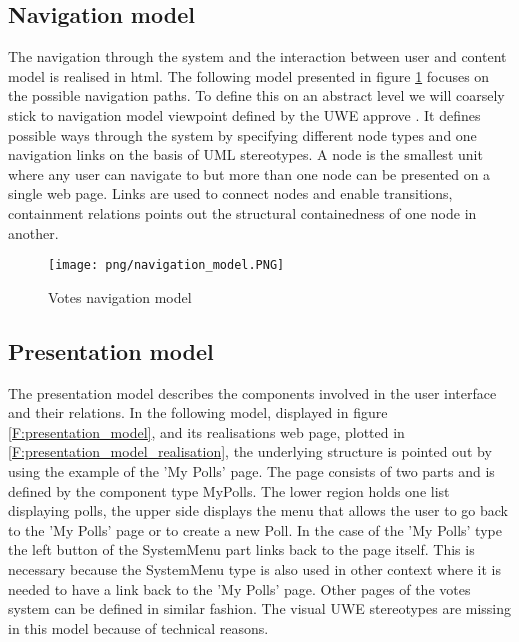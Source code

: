 \subsection{Navigation model}
The navigation through the system and the interaction between user and content model is realised in html. The following model presented in figure \ref{F:navigation_model} focuses on the possible navigation paths. To define this on an abstract level we will coarsely stick to navigation model viewpoint defined by the UWE approve \cite{Uwe08,uweref}. It defines possible ways through the system by specifying different node types and one navigation links on the basis of UML stereotypes. A node is the smallest unit where any user can navigate to but more than one node can be presented on a single web page. Links are used to connect nodes and enable transitions, containment relations points out the structural containedness of one node in another.

\begin{figure}
\centering
\texttt{[image: png/navigation\_model.PNG]}
\caption{Votes navigation model}
\label{F:navigation_model}
\end{figure}

\subsection{Presentation model}

The presentation model describes the components involved in the user interface and their relations. In the following model, displayed in figure \ref{F:presentation_model}, and its realisations web page, plotted in \ref{F:presentation_model_realisation}, the underlying structure is pointed out by using the example of the 'My Polls' page. The page consists of two parts and is defined by the component type MyPolls. The lower region holds one list displaying polls, the upper side displays the menu that allows the user to go back to the 'My Polls' page or to create a new Poll. In the case of the 'My Polls' type the left button of the SystemMenu part links back to the page itself. This is necessary because the SystemMenu type is also used in other context where it is needed to have a link back to the 'My Polls' page. Other pages of the votes system can be defined in similar fashion. The visual UWE stereotypes are missing in this model because of technical reasons.

